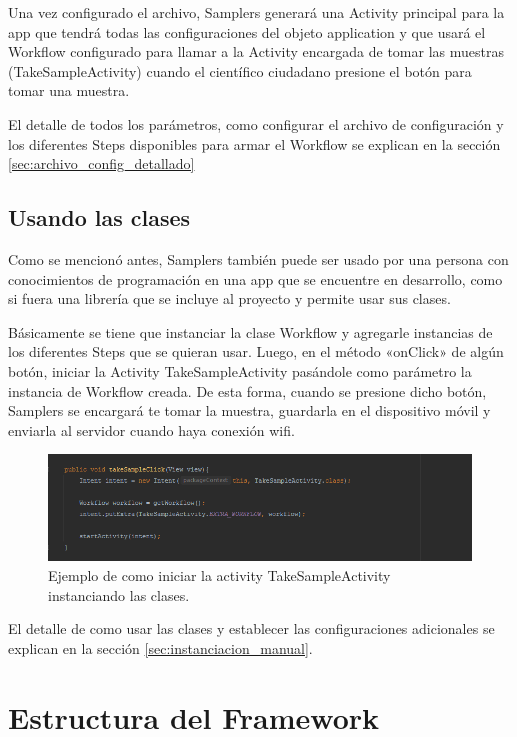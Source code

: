 Una vez configurado el archivo, Samplers generará una Activity principal para la app que tendrá todas las configuraciones del objeto application y que usará el Workflow configurado para llamar a la Activity encargada de tomar las muestras (TakeSampleActivity) cuando el científico ciudadano presione el botón para tomar una muestra.

El detalle de todos los parámetros, como configurar el archivo de configuración y los diferentes Steps disponibles para armar el Workflow se explican en la sección \ref{sec:archivo_config_detallado}


\subsection{Usando las clases} \label{sec:usando_las_clases}
Como se mencionó antes, Samplers también puede ser usado por una persona con conocimientos de programación en una app que se encuentre en desarrollo, como si fuera una librería que se incluye al proyecto y permite usar sus clases. 

Básicamente se tiene que instanciar la clase Workflow y agregarle instancias de los diferentes Steps que se quieran usar. Luego, en el método «onClick» de algún botón, iniciar la Activity TakeSampleActivity pasándole como parámetro la instancia de Workflow creada. De esta forma, cuando se presione dicho botón, Samplers se encargará te tomar la muestra, guardarla en el dispositivo móvil y enviarla al servidor cuando haya conexión wifi.

\begin{figure}[H]
  \centering
    \includegraphics[scale=0.6]{05-implementacion/take_sample_click.png} 
   \caption{Ejemplo de como iniciar la activity TakeSampleActivity instanciando las clases.}
\end{figure}	

El detalle de como usar las clases y establecer las configuraciones adicionales se explican en la sección \ref{sec:instanciacion_manual}.

\section{Estructura del Framework}

